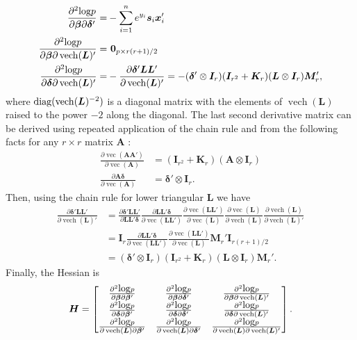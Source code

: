 \documentclass[12pt]{article}
\def\diag{\hbox{diag}}
\def\diag{\hbox{diag}}
\def\log{\hbox{log}}
\DeclareMathOperator{\vect}{vec}
\DeclareMathOperator{\vech}{vech}
\begin{document}
\begin{appendix}
\begin{align*}
\frac{\partial^2 \log p}{\partial \bm{\beta} \partial \bm{\delta}'} =& -\sum_{i=1}^ne^{y_i}\bm{s}_i\bm{x}_i'\\
\frac{\partial^2 \log p}{\partial \bm{\beta} \partial \vech(\bm{L})'} =&\  \bm{0}_{p\times r(r+1)/2}\\
\frac{\partial^2 \log p}{\partial \bm{\delta} \partial \vech(\bm{L})'} =&-\frac{\partial \bm{\delta}'\bm{L}\bm{L}'}{\partial \vech(\bm{L})'} =  -(\bm{\delta}' \otimes \bm{I}_r)(\bm{I}_{r^2} + \bm{K}_r)(\bm{L}\otimes \bm{I}_r) \bm{M}_r',
\end{align*}
where $\diag(\vech(\bm{L})^{-2})$ is a diagonal matrix with the elements of $\vech(\bm{L})$ raised to the power $-2$ along the diagonal. The last second derivative matrix can be derived using repeated application of the chain rule and from the following facts for any $r\times r$ matrix $\bm{A}$ \citep{magnus2007matrix}:
\begin{align*}
\frac{\partial \vect(\bm{A}\bm{A}')}{\partial \vect(\bm{A})} & = (\bm{I}_{r^2} + \bm{K}_r)(\bm{A}\otimes \bm{I}_r)\\
\frac{\partial \bm{A}\bm{\delta}}{\partial \vect(\bm{A})}& = \bm{\delta}' \otimes \bm{I}_r.
\end{align*}
Then, using the chain rule for lower triangular $\bm{L}$ we have
\begin{align*}
\frac{\partial \bm{\delta}'\bm{L}\bm{L'}}{\partial\vech(\bm{L})'} &= \frac{\partial \bm{\delta}'\bm{L}\bm{L'}}{\partial \bm{L}\bm{L}'\bm{\delta}} \frac{\partial \bm{L}\bm{L}'\bm{\delta}}{\partial \vect(\bm{L}\bm{L}')} \frac{\partial \vect(\bm{L}\bm{L}')}{\partial \vect(\bm{L})}\frac{\partial \vect(\bm{L})}{\partial \vech(\bm{L})}\frac{\partial \vech(\bm{L})}{\partial \vech(\bm{L})'}\\
&= \bm{I}_r \frac{\partial \bm{L}\bm{L}'\bm{\delta}}{\partial \vect(\bm{L}\bm{L}')} \frac{\partial \vect(\bm{L}\bm{L}')}{\partial \vect(\bm{L})} \bm{M}_r'\bm{I}_{r(r+1)/2}\\
&= (\bm{\delta}' \otimes \bm{I}_r)(\bm{I}_{r^2} + \bm{K}_r)(\bm{L}\otimes \bm{I}_r) \bm{M}_r'.
\end{align*}
Finally, the Hessian is
\begin{align*}
\bm{H} = \begin{bmatrix} \frac{\partial^2 \log p}{\partial \bm{\beta} \partial \bm{\beta}'} & \frac{\partial^2 \log p}{\partial \bm{\beta} \partial \bm{\delta} '} & \frac{\partial^2 \log p}{\partial \bm{\beta} \partial \vech(\bm{L}) '}\\
\frac{\partial^2 \log p}{\partial \bm{\delta} \partial \bm{\beta}'}  & \frac{\partial^2 \log p}{ \partial \bm{\delta} \partial \bm{\delta}'} & \frac{\partial^2 \log p}{ \partial \bm{\delta} \partial \vech(\bm{L})'}\\
\frac{\partial^2 \log p}{\partial \vech(\bm{L}) \partial \bm{\beta}'} & \frac{\partial^2 \log p}{ \partial \vech(\bm{L}) \partial \bm{\delta}'} & \frac{\partial^2 \log p}{\partial \vech(\bm{L}) \partial \vech(\bm{L})'} 
\end{bmatrix}.
\end{align*}
\end{appendix}
\end{document}
